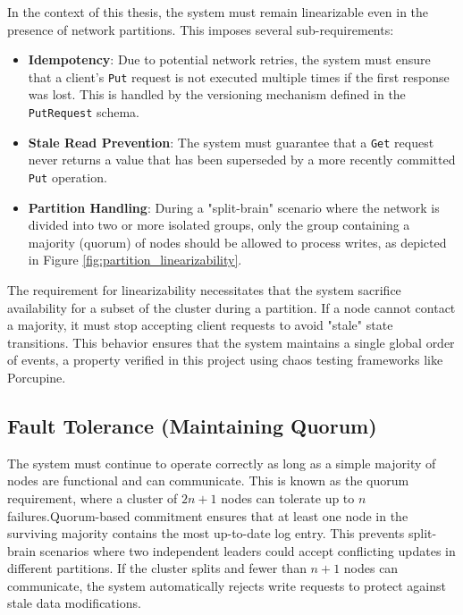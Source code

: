 In the context of this thesis, the system must remain linearizable even in the presence of network partitions. This imposes several sub-requirements:
\begin{itemize}
    \item \textbf{Idempotency}: Due to potential network retries, the system must ensure that a client's \texttt{Put} request is not executed multiple times if the first response was lost. This is handled by the versioning mechanism defined in the \texttt{PutRequest} schema.
    \item \textbf{Stale Read Prevention}: The system must guarantee that a \texttt{Get} request never returns a value that has been superseded by a more recently committed \texttt{Put} operation.
    \item \textbf{Partition Handling}: During a "split-brain" scenario where the network is divided into two or more isolated groups, only the group containing a majority (quorum) of nodes should be allowed to process writes, as depicted in Figure \ref{fig:partition_linearizability}.
\end{itemize}

The requirement for linearizability necessitates that the system sacrifice availability for a subset of the cluster during a partition.
If a node cannot contact a majority, it must stop accepting client requests to avoid "stale" state transitions. This behavior ensures that the system maintains a single global order of events, a property verified in this project using chaos testing frameworks like Porcupine.

\subsection{Fault Tolerance (Maintaining Quorum)}
The system must continue to operate correctly as long as a simple majority of nodes are functional and can communicate. This is known as the quorum requirement, where a cluster of $2n + 1$ nodes can tolerate up to $n$ failures.Quorum-based commitment ensures that at least one node in the surviving majority contains the most up-to-date log entry. This prevents split-brain scenarios where two independent leaders could accept conflicting updates in different partitions. If the cluster splits and fewer than $n+1$ nodes can communicate, the system automatically rejects write requests to protect against stale data modifications.

